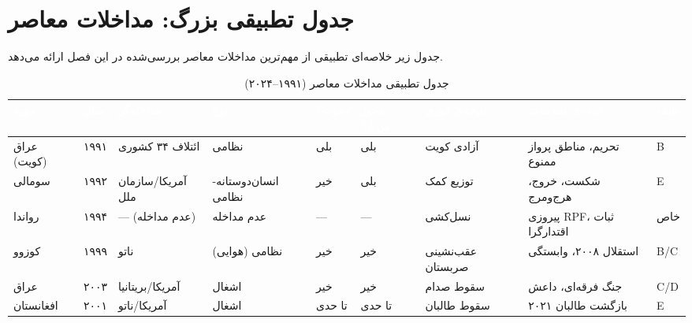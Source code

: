 \section{جدول تطبیقی بزرگ: مداخلات معاصر}
\label{sec:ch10-comparative-table}

جدول زیر خلاصه‌ای تطبیقی از مهم‌ترین مداخلات معاصر بررسی‌شده در این فصل ارائه می‌دهد.

\begin{landscape}
\begin{table}[htbp]
\centering
\caption{جدول تطبیقی مداخلات معاصر (۱۹۹۱–۲۰۲۴)}
\label{tab:ch10-comparative}
\begin{adjustbox}{max width=\linewidth}
\begin{tabularx}{\linewidth}{
    >{\raggedleft\arraybackslash}p{1.8cm}
    >{\centering\arraybackslash}p{1.2cm}
    >{\raggedleft\arraybackslash}p{2.2cm}
    >{\raggedleft\arraybackslash}p{1.8cm}
    >{\centering\arraybackslash}p{1.2cm}
    >{\centering\arraybackslash}p{1.5cm}
    >{\raggedleft\arraybackslash}p{2.5cm}
    >{\raggedleft\arraybackslash}p{3cm}
    >{\centering\arraybackslash}p{1cm}
}
\toprule
\rowcolor{PrimaryDeep}
\textcolor{white}{\textbf{مورد}} &
\textcolor{white}{\textbf{سال}} &
\textcolor{white}{\textbf{مداخله‌گر}} &
\textcolor{white}{\textbf{نوع}} &
\textcolor{white}{\textbf{دعوت؟}} &
\textcolor{white}{\textbf{مجوز ش.ا.؟}} &
\textcolor{white}{\textbf{نتیجه‌ی فوری}} &
\textcolor{white}{\textbf{نتیجه‌ی بلندمدت}} &
\textcolor{white}{\textbf{طیف}} \\
\midrule

عراق (کویت) & ۱۹۹۱ & ائتلاف ۳۴ کشوری & نظامی & بلی & بلی & آزادی کویت & تحریم، مناطق پرواز ممنوع & B \\
\rowcolor{NeutralLight}
سومالی & ۱۹۹۲ & آمریکا/سازمان ملل & انسان‌دوستانه-نظامی & خیر & بلی & توزیع کمک & شکست، خروج، هرج‌ومرج & E \\

رواندا & ۱۹۹۴ & — (عدم مداخله) & عدم مداخله & — & — & نسل‌کشی & پیروزی RPF، ثبات اقتدارگرا & خاص \\
\rowcolor{NeutralLight}
کوزوو & ۱۹۹۹ & ناتو & نظامی (هوایی) & خیر & خیر & عقب‌نشینی صربستان & استقلال ۲۰۰۸، وابستگی & B/C \\

عراق & ۲۰۰۳ & آمریکا/بریتانیا & اشغال & خیر & خیر & سقوط صدام & جنگ فرقه‌ای، داعش & C/D \\
\rowcolor{NeutralLight}
افغانستان & ۲۰۰۱ & آمریکا/ناتو & اشغال & تا حدی & تا حدی & سقوط طالبان & بازگشت طالبان ۲۰۲۱ & E \\


\end{tabularx}
\end{adjustbox}
\end{table}
\end{landscape}
